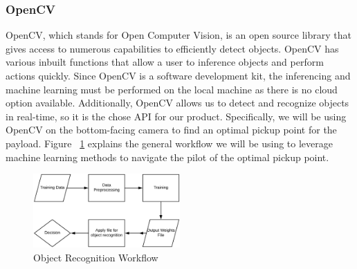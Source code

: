 \documentclass[onecolumn, draftclsnofoot, 10pt, compsoc]{IEEEtran}
\begin{document}
\subsubsection{OpenCV}
OpenCV, which stands for Open Computer Vision, is an open source library that gives access to numerous capabilities to efficiently detect objects. OpenCV has various inbuilt functions that allow a user to inference objects and perform actions quickly. Since OpenCV is a software development kit, the inferencing and machine learning must be performed on the local machine as there is no cloud option available. Additionally, OpenCV allows us to detect and recognize objects in real-time, so it is the chose API for our product. Specifically, we will be using OpenCV on the bottom-facing camera to find an optimal pickup point for the payload. Figure ~\ref{fig:ObjectRecognitionWorkflow} explains the general workflow we will be using to leverage machine learning methods to navigate the pilot of the optimal pickup point.

\begin{figure}[h!]
    \centering
    \includegraphics[width=0.5\textwidth]{graphics/object_recognition_workflow.eps}
    \caption{Object Recognition Workflow}
    \label{fig:ObjectRecognitionWorkflow}
\end{figure}
\end{document}
